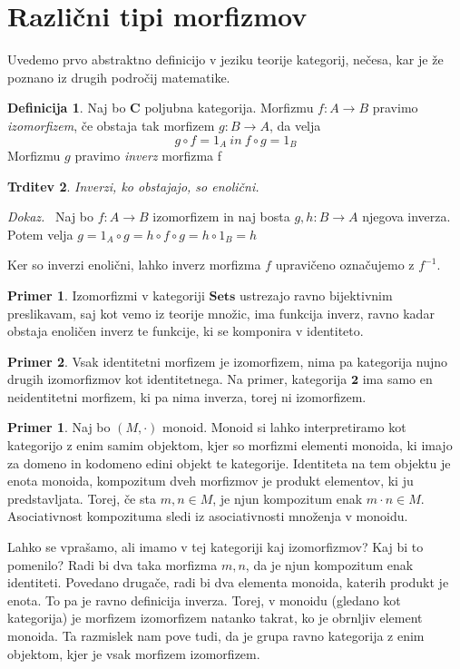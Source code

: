 \documentclass[12pt,a4paper]{book}
\theoremstyle{definition}
\newtheorem{definicija}{Definicija}[chapter]
\theoremstyle{plain}
\newtheorem{trditev}[definicija]{Trditev}
\newenvironment{dokaz}{\emph{Dokaz.}\ }{\hspace{\fill}{$\Box$}}
\theoremstyle{definition}
\newtheorem{primer}{Primer}[section]
\newtheorem*{primer*}{Primer}
\theoremstyle{remark}
\newcommand{\cat}[1]{\textbf{#1}}
\begin{document}
\section{Različni tipi morfizmov}
Uvedemo prvo abstraktno definicijo v jeziku teorije kategorij, nečesa, kar je že poznano iz drugih področij matematike.

\begin{definicija} Naj bo \cat{C} poljubna kategorija. Morfizmu $f : A \to B$ pravimo \emph{izomorfizem}, če obstaja tak morfizem $g : B \to A$, da velja
$$g \circ f = 1_A \ in \ f \circ g = 1_B$$
Morfizmu $g$ pravimo \emph{inverz} morfizma f
\end{definicija}

\begin{trditev} Inverzi, ko obstajajo, so enolični.
\end{trditev}
\begin{dokaz}
Naj bo $f : A \to B$ izomorfizem in naj bosta $g,h: B \to A$ njegova inverza. Potem velja $g = 1_A \circ g = h \circ f \circ g = h \circ 1_B = h$
\end{dokaz}

Ker so inverzi enolični, lahko inverz morfizma $f$ upravičeno označujemo z $f^{-1}$.

\begin{primer*}
Izomorfizmi v kategoriji $\cat{Sets}$ ustrezajo ravno bijektivnim preslikavam, saj kot vemo iz teorije množic, ima funkcija inverz, ravno kadar obstaja enoličen inverz te funkcije, ki se komponira v identiteto. 
\end{primer*}

\begin{primer*}
Vsak identitetni morfizem je izomorfizem, nima pa kategorija nujno drugih izomorfizmov kot identitetnega. Na primer, kategorija $\cat{2}$ ima samo en neidentitetni morfizem, ki pa nima inverza, torej ni izomorfizem.
\end{primer*}

\begin{primer}
Naj bo $(M,\cdot)$ monoid. Monoid si lahko interpretiramo kot kategorijo z enim samim objektom, kjer so morfizmi elementi monoida, ki imajo za domeno in kodomeno edini objekt te kategorije. Identiteta na tem objektu je enota monoida, kompozitum dveh morfizmov je produkt elementov, ki ju predstavljata. Torej, če sta $m,n \in M$, je njun kompozitum enak $m \cdot n \in M$. Asociativnost kompozituma sledi iz asociativnosti množenja v monoidu.

Lahko se vprašamo, ali imamo v tej kategoriji kaj izomorfizmov? Kaj bi to pomenilo? Radi bi dva taka morfizma $m,n$, da je njun kompozitum enak identiteti. Povedano drugače, radi bi dva elementa monoida, katerih produkt je enota. To pa je ravno definicija inverza. Torej, v monoidu (gledano kot kategorija) je morfizem izomorfizem natanko takrat, ko je obrnljiv element monoida. Ta razmislek nam pove tudi, da je grupa ravno kategorija z enim objektom, kjer je vsak morfizem izomorfizem.
\end{primer}
\end{document}

